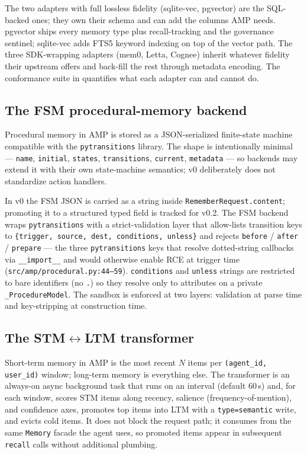 \documentclass[11pt,letterpaper,twocolumn]{article}
\begin{document}
The two adapters with full lossless fidelity (sqlite-vec, pgvector) are the SQL-backed ones; they own their schema and can add the columns AMP needs. pgvector ships every memory type plus recall-tracking and the governance sentinel; sqlite-vec adds FTS5 keyword indexing on top of the vector path. The three SDK-wrapping adapters (mem0, Letta, Cognee) inherit whatever fidelity their upstream offers and back-fill the rest through metadata encoding. The conformance suite in  quantifies what each adapter can and cannot do.

\subsection{The FSM procedural-memory backend}
\label{sec:impl-fsm}

Procedural memory in AMP is stored as a JSON-serialized finite-state machine compatible with the \texttt{pytransitions} library. The shape is intentionally minimal --- \texttt{name}, \texttt{initial}, \texttt{states}, \texttt{transitions}, \texttt{current}, \texttt{metadata} --- so backends may extend it with their own state-machine semantics; v0 deliberately does not standardize action handlers.

In v0 the FSM JSON is carried as a string inside \texttt{RememberRequest.content}; promoting it to a structured typed field is tracked for v0.2. The FSM backend wraps \texttt{pytransitions} with a strict-validation layer that allow-lists transition keys to \texttt{\{trigger, source, dest, conditions, unless\}} and rejects \texttt{before} / \texttt{after} / \texttt{prepare} --- the three \texttt{pytransitions} keys that resolve dotted-string callbacks via \texttt{\_\_import\_\_} and would otherwise enable RCE at trigger time (\texttt{src/amp/procedural.py:44--59}). \texttt{conditions} and \texttt{unless} strings are restricted to bare identifiers (no \texttt{.}) so they resolve only to attributes on a private \texttt{\_ProcedureModel}. The sandbox is enforced at two layers: validation at parse time and key-stripping at construction time.

\subsection{The STM$\leftrightarrow$LTM transformer}
\label{sec:impl-stm-ltm}

Short-term memory in AMP is the most recent $N$ items per \texttt{(agent\_id, user\_id)} window; long-term memory is everything else. The transformer is an always-on async background task that runs on an interval (default 60\,s) and, for each window, scores STM items along recency, salience (frequency-of-mention), and confidence axes, promotes top items into LTM with a \texttt{type=semantic} write, and evicts cold items. It does not block the request path; it consumes from the same \texttt{Memory} facade the agent uses, so promoted items appear in subsequent \texttt{recall} calls without additional plumbing.
\end{document}
